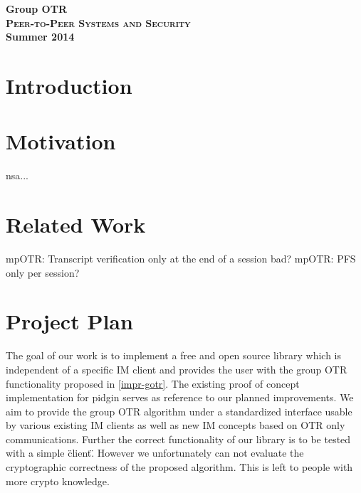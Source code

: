 

\title{}
\author{Markus Teich, Jannik Theiß}
\date{\today}



\begin{center}
\huge \textbf{Group OTR} \\
\vspace{2cm}
\LARGE\textbf{\textsc{Peer-to-Peer Systems and Security}}\\
\vspace{0.5cm}
\textbf{Summer 2014}
\vspace{3.5cm}
\end{center}


\section{Introduction}


\section{Motivation}
nsa...

\section{Related Work}

mpOTR: Transcript verification only at the end of a session bad?
mpOTR: PFS only per session?

\section{Project Plan}

The goal of our work is to implement a free and open source library which is
independent of a specific IM client and provides the user with the group OTR
functionality proposed in \ref{impr-gotr}. The existing proof of concept
implementation for pidgin serves as reference to our planned improvements. We
aim to provide the group OTR algorithm under a standardized interface usable by
various existing IM clients as well as new IM concepts based on OTR only
communications. Further the correct functionality of our library is to be tested
with a simple \"client\". However we unfortunately can not evaluate the
cryptographic correctness of the proposed algorithm. This is left to people with
more crypto knowledge.

